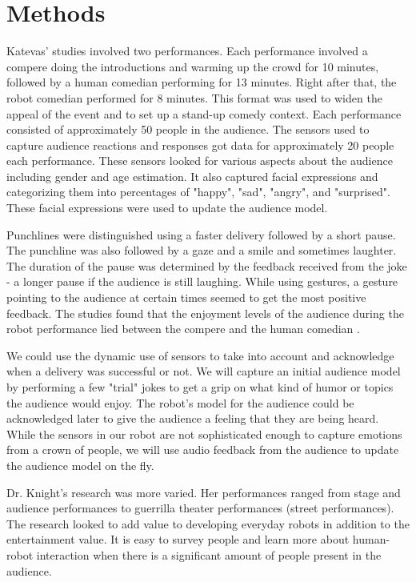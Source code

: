 \section{Methods}

Katevas' studies involved two performances. Each performance involved a compere doing the introductions and warming up the crowd for 10 minutes, followed by a human comedian performing for 13 minutes. Right after that, the robot comedian performed for 8 minutes. This format was used to widen the appeal of the event and to set up a stand-up comedy context. Each performance consisted of approximately 50 people in the audience. The sensors used to capture audience reactions and responses got data for approximately 20 people each performance. These sensors looked for various aspects about the audience including gender and age estimation. It also captured facial expressions and categorizing them into percentages of "happy", "sad", "angry", and "surprised". These facial expressions were used to update the audience model.

Punchlines were distinguished using a faster delivery followed by a short pause. The punchline was also followed by a gaze and a smile and sometimes laughter. The duration of the pause was determined by the feedback received from the joke - a longer pause if the audience is still laughing. While using gestures, a gesture pointing to the audience at certain times seemed to get the most positive feedback. The studies found that the enjoyment levels of the audience during the robot performance lied between the compere and the human comedian \cite{RobotComedyLab:2015}.

We could use the dynamic use of sensors to take into account and acknowledge when a delivery was successful or not. We will capture an initial audience model by performing a few "trial" jokes to get a grip on what kind of humor or topics the audience would enjoy. The robot's model for the audience could be acknowledged later to give the audience a feeling that they are being heard. While the sensors in our robot are not sophisticated enough to capture emotions from a crown of people, we will use audio feedback from the audience to update the audience model on the fly.

Dr. Knight's research was more varied. Her performances ranged from stage and audience performances to guerrilla theater performances (street performances). The research looked to add value to developing everyday robots in addition to the entertainment value. It is easy to survey people and learn more about human-robot interaction when there is a significant amount of people present in the audience.

